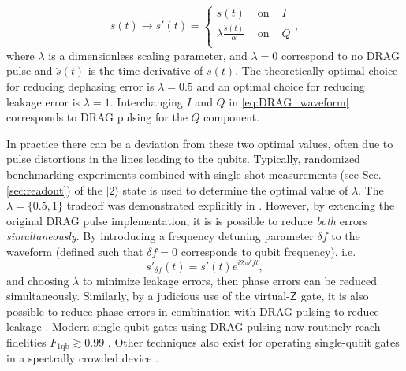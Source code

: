 \documentclass[aip,apr,twocolumn,showpacs,superscriptaddress,groupedaddress,nofootinbib,reprint]{revtex4-1}  %
\newcommand{\Z}[1]{\textsf{Z}_{#1}}
\begin{document}
\begin{equation}
\renewcommand*{\arraystretch}{1.3}
s(t)\rightarrow s'(t) =
\left\{\begin{array}{ccl}
s(t) & \text{ on } & I\\
\displaystyle \lambda\frac{\dot s(t)}{\alpha} & \text{ on } & Q\\
\end{array}\right., \label{eq:DRAG_waveform}
\end{equation}
where $\lambda$ is a dimensionless scaling parameter, and $\lambda = 0$ correspond to no DRAG pulse and $\dot{s}(t)$ is the time derivative of $s(t)$. The theoretically optimal choice for reducing dephasing error is $\lambda = 0.5$ and an optimal choice for reducing leakage error is $\lambda = 1$\cite{Gambetta2011,Motzoi2013}. Interchanging $I$ and $Q$ in \cref{eq:DRAG_waveform} corresponds to DRAG pulsing for the $Q$ component.

In practice there can be a deviation from these two optimal values, often due to pulse distortions in the lines leading to the qubits. Typically, randomized benchmarking experiments combined with single-shot measurements (see Sec. \ref{sec:readout}) of the $|2\rangle$ state is used to determine the optimal value of $\lambda$. The $\lambda=\{0.5,1\}$ tradeoff was demonstrated explicitly in \cite{Chen2016,McKay2017}. However, by extending the original DRAG pulse implementation\cite{Chow2010,Lucero2010}, it is is possible to reduce \emph{both} errors \emph{simultaneously}. By introducing a frequency detuning parameter $\delta f$ to the waveform\cite{Gambetta2011} (defined such that $\delta f = 0$ corresponds to qubit frequency), i.e.
\begin{equation}
s'_{\delta f}(t) = s'(t)e^{i2\pi\delta f t},
\end{equation}
and choosing $\lambda$ to minimize leakage errors, then phase errors can be reduced simultaneously\cite{Chen2016}. Similarly, by a judicious use of the virtual-$\Z{}$ gate, it is also possible to reduce phase errors in combination with DRAG pulsing to reduce leakage \cite{McKay2017}. Modern single-qubit gates using DRAG pulsing now routinely reach fidelities $F_\text{1qb} \gtrsim 0.99$ \cite{Gustavsson2013,Barends2014,Sheldon2016,Sheldon2016a,Chen2016,Rol2017,Reagor2018}. Other techniques also exist for operating single-qubit gates in a spectrally crowded device \cite{Schutjens2013,Theis2016}.



\end{document}
